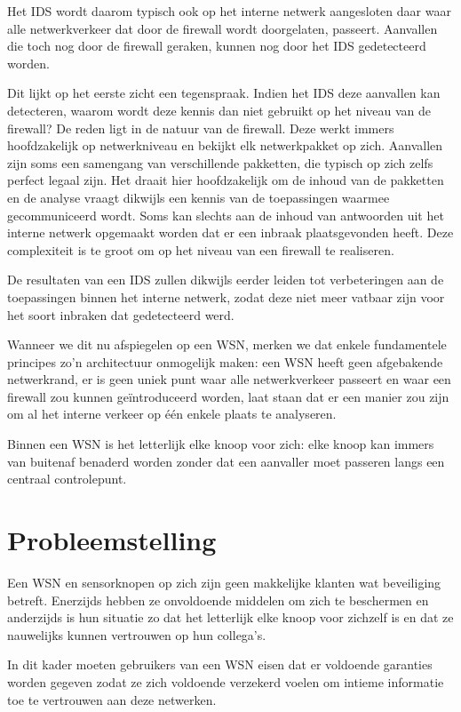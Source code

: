 Het IDS wordt daarom typisch ook op het interne netwerk aangesloten daar waar
alle netwerkverkeer dat door de firewall wordt doorgelaten, passeert. Aanvallen
die toch nog door de firewall geraken, kunnen nog door het IDS gedetecteerd
worden.

Dit lijkt op het eerste zicht een tegenspraak. Indien het IDS deze aanvallen
kan detecteren, waarom wordt deze kennis dan niet gebruikt op het niveau van de
firewall? De reden ligt in de natuur van de firewall. Deze werkt immers
hoofdzakelijk op netwerkniveau en bekijkt elk netwerkpakket op zich. Aanvallen
zijn soms een samengang van verschillende pakketten, die typisch op zich zelfs
perfect legaal zijn. Het draait hier hoofdzakelijk om de inhoud van de
pakketten en de analyse vraagt dikwijls een kennis van de toepassingen waarmee
gecommuniceerd wordt. Soms kan slechts aan de inhoud van antwoorden uit het
interne netwerk opgemaakt worden dat er een inbraak plaatsgevonden heeft. Deze
complexiteit is te groot om op het niveau van een firewall te realiseren.

De resultaten van een IDS zullen dikwijls eerder leiden tot verbeteringen aan
de toepassingen binnen het interne netwerk, zodat deze niet meer vatbaar zijn
voor het soort inbraken dat gedetecteerd werd.

Wanneer we dit nu afspiegelen op een WSN, merken we dat enkele fundamentele
principes zo'n architectuur onmogelijk maken: een WSN heeft geen afgebakende
netwerkrand, er is geen uniek punt waar alle netwerkverkeer passeert en waar
een firewall zou kunnen ge\"introduceerd worden, laat staan dat er een manier
zou zijn om al het interne verkeer op \'e\'en enkele plaats te analyseren.

Binnen een WSN is het letterlijk elke knoop voor zich: elke knoop kan immers
van buitenaf benaderd worden zonder dat een aanvaller moet passeren langs een
centraal controlepunt.

\section{Probleemstelling}
\label{section:probleem}

Een WSN en sensorknopen op zich zijn geen makkelijke klanten wat beveiliging
betreft. Enerzijds hebben ze onvoldoende middelen om zich te beschermen en
anderzijds is hun situatie zo dat het letterlijk elke knoop voor zichzelf is en
dat ze nauwelijks kunnen vertrouwen op hun collega's.

In dit kader moeten gebruikers van een WSN eisen dat er voldoende garanties
worden gegeven zodat ze zich voldoende verzekerd voelen om intieme informatie
toe te vertrouwen aan deze netwerken.

